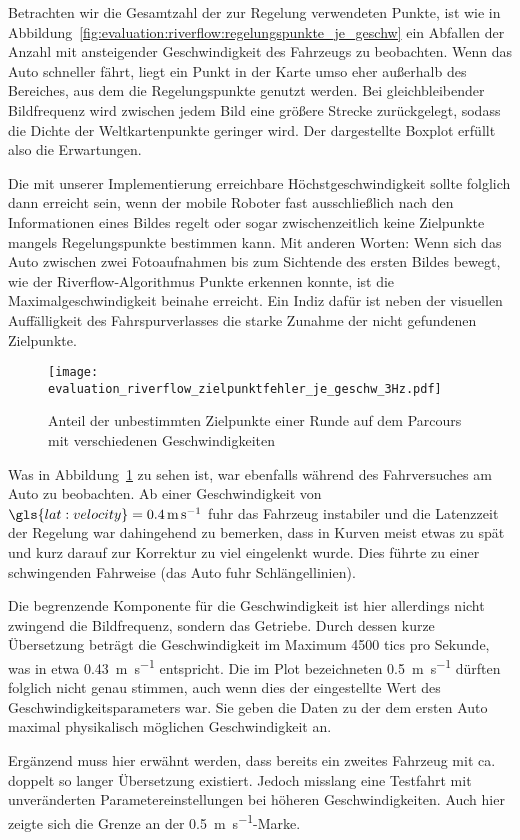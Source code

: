 Betrachten wir die Gesamtzahl der zur Regelung verwendeten Punkte, ist wie in Abbildung~\ref{fig:evaluation:riverflow:regelungspunkte_je_geschw} ein Abfallen der Anzahl mit ansteigender Geschwindigkeit des Fahrzeugs zu beobachten. Wenn das Auto schneller fährt, liegt ein Punkt in der Karte umso eher außerhalb des Bereiches, aus dem die Regelungspunkte genutzt werden. Bei gleichbleibender Bildfrequenz wird zwischen jedem Bild eine größere Strecke zurückgelegt, sodass die Dichte der Weltkartenpunkte geringer wird. Der dargestellte Boxplot erfüllt also die Erwartungen.

Die mit unserer Implementierung erreichbare Höchstgeschwindigkeit sollte folglich dann erreicht sein, wenn der mobile Roboter fast ausschließlich nach den Informationen eines Bildes regelt oder sogar zwischenzeitlich keine Zielpunkte mangels Regelungspunkte bestimmen kann. Mit anderen Worten: Wenn sich das Auto zwischen zwei Fotoaufnahmen bis zum Sichtende des ersten Bildes bewegt, wie der Riverflow-Algorithmus Punkte erkennen konnte, ist die Maximalgeschwindigkeit beinahe erreicht. Ein Indiz dafür ist neben der visuellen Auffälligkeit des Fahrspurverlasses die starke Zunahme der nicht gefundenen Zielpunkte. 

\begin{figure}[h] %
	\centering
	\texttt{[image: evaluation\_riverflow\_zielpunktfehler\_je\_geschw\_3Hz.pdf]}
	\caption{Anteil der unbestimmten Zielpunkte einer Runde auf dem Parcours mit verschiedenen Geschwindigkeiten}
	\label{fig:evaluation:riverflow:zielpunktfehler_je_geschw}
\end{figure}

Was in Abbildung~\ref{fig:evaluation:riverflow:zielpunktfehler_je_geschw} zu sehen ist, war ebenfalls während des Fahrversuches am Auto zu beobachten. Ab einer Geschwindigkeit von \( \gls{lat:velocity} = \SI{0,4}{\metre\per\second} \) fuhr das Fahrzeug instabiler und die Latenzzeit der Regelung war dahingehend zu bemerken, dass in Kurven meist etwas zu spät und kurz darauf zur Korrektur zu viel eingelenkt wurde. Dies führte zu einer schwingenden Fahrweise (das Auto fuhr \glqq Schlängellinien\grqq). 

Die begrenzende Komponente für die Geschwindigkeit ist hier allerdings nicht zwingend die Bildfrequenz, sondern das Getriebe. Durch dessen kurze Übersetzung beträgt die Geschwindigkeit im Maximum 4500 tics pro Sekunde, was in etwa \SI{0,43}{\metre\per\second} entspricht. Die im Plot bezeichneten \SI{0,5}{\metre\per\second} dürften folglich nicht genau stimmen, auch wenn dies der eingestellte Wert des Geschwindigkeitsparameters war. Sie geben die Daten zu der dem ersten Auto maximal physikalisch möglichen Geschwindigkeit an. 

Ergänzend muss hier erwähnt werden, dass bereits ein zweites Fahrzeug mit ca. doppelt so langer Übersetzung existiert. Jedoch misslang eine Testfahrt mit unveränderten Parametereinstellungen bei höheren Geschwindigkeiten. Auch hier zeigte sich die Grenze an der \SI{0,5}{\metre\per\second}-Marke.

